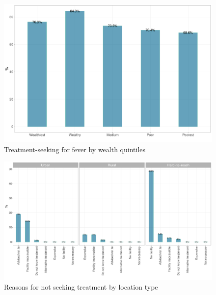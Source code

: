 \documentclass[12pt,a4paper]{article}
\begin{document}
\begin{figure}[H]

{\centering \includegraphics{kayahReport_files/figure-latex/fever2plot-1} 

}

\caption{Treatment-seeking for fever by wealth quintiles}\label{fig:fever2plot}
\end{figure}

\begin{figure}[H]

{\centering \includegraphics{kayahReport_files/figure-latex/fever3plot-1} 

}

\caption{Reasons for not seeking treatment by location type}\label{fig:fever3plot}
\end{figure}
\end{document}
